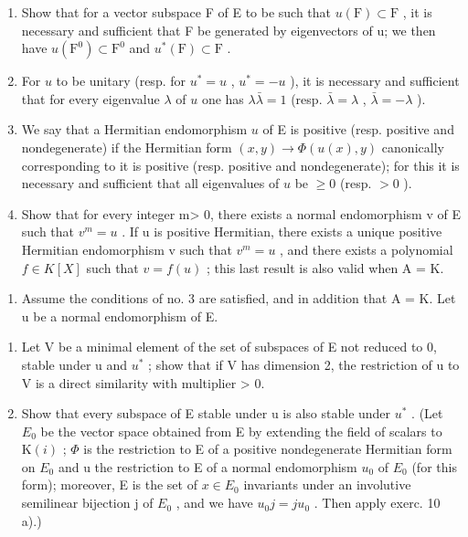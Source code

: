 \begin{enumerate}
\def\labelenumi{\alph{enumi})}
\item
  Show that for a vector subspace F of E to be such that \(u(\mathrm{F}) \subset \mathrm{F}\) , it is necessary and sufficient that F be generated by eigenvectors of u; we then have \(u(\mathrm{F}^{0}) \subset \mathrm{F}^{0}\) and \(u^{*}(\mathrm{F}) \subset \mathrm{F}\) .
\item
  For \(u\) to be unitary (resp. for \(u^{*} = u\) , \(u^{*} = -u\) ), it is necessary and sufficient that for every eigenvalue \(\lambda\) of \(u\) one has \(\lambda \bar{\lambda} = 1\) (resp. \(\bar{\lambda} = \lambda\) , \(\bar{\lambda} = -\lambda\) ).
\item
  We say that a Hermitian endomorphism \(u\) of E is positive (resp. positive and nondegenerate) if the Hermitian form \((x, y) \to \Phi(u(x), y)\) canonically corresponding to it is positive (resp. positive and nondegenerate); for this it is necessary and sufficient that all eigenvalues of \(u\) be \(\geqslant 0\) (resp. \(>0\) ).
\item
  Show that for every integer m\textgreater{} 0, there exists a normal endomorphism v of E such that \(v^{m}=u\) . If u is positive Hermitian, there exists a unique positive Hermitian endomorphism v such that \(v^{m}=u\) , and there exists a polynomial \(f\in K[X]\) such that \(v=f(u)\) ; this last result is also valid when A = K.
\end{enumerate}

\begin{enumerate}
\def\labelenumi{\arabic{enumi})}
\setcounter{enumi}{10}
\tightlist
\item
  Assume the conditions of no. 3 are satisfied, and in addition that A = K. Let u be a normal endomorphism of E.
\end{enumerate}

\begin{enumerate}
\def\labelenumi{\alph{enumi})}
\item
  Let V be a minimal element of the set of subspaces of E not reduced to 0, stable under u and \(u^{*}\) ; show that if V has dimension 2, the restriction of u to V is a direct similarity with multiplier \textgreater{} 0.
\item
  Show that every subspace of E stable under u is also stable under \(u^{*}\) . (Let \(E_{0}\) be the vector space obtained from E by extending the field of scalars to \(\mathrm{K}(i)\) ; \(\Phi\) is the restriction to E of a positive nondegenerate Hermitian form on \(E_{0}\) and u the restriction to E of a normal endomorphism \(u_{0}\) of \(E_{0}\) (for this form); moreover, E is the set of \(x \in E_{0}\) invariants under an involutive semilinear bijection j of \(E_{0}\) , and we have \(u_{0}j = ju_{0}\) . Then apply exerc. 10 a).)
\end{enumerate}

